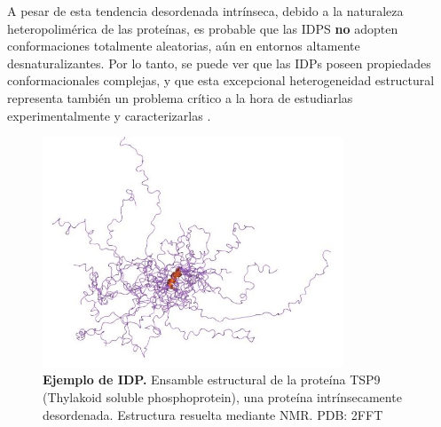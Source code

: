 A pesar de esta tendencia desordenada intrínseca, debido a la naturaleza heteropolimérica de las proteínas, es probable que las IDPS \textbf{no} adopten conformaciones 
totalmente aleatorias, aún en entornos altamente desnaturalizantes.%
Por lo tanto, se puede ver que las IDPs poseen propiedades conformacionales complejas, y que esta 
excepcional heterogeneidad estructural representa también un problema crítico a la hora de estudiarlas experimentalmente y caracterizarlas \cite{eliezer2009biophysical}.


\begin{figure}[h]
\centering
\includegraphics[width=0.8\textwidth]{img/idpExample-TSP9.jpg} 
\caption{\textbf{Ejemplo de IDP.} Ensamble estructural de la proteína TSP9 (Thylakoid soluble phosphoprotein), una proteína intrínsecamente desordenada. Estructura resuelta mediante NMR. PDB: 2FFT} 
\label{idpExample}
\end{figure}








